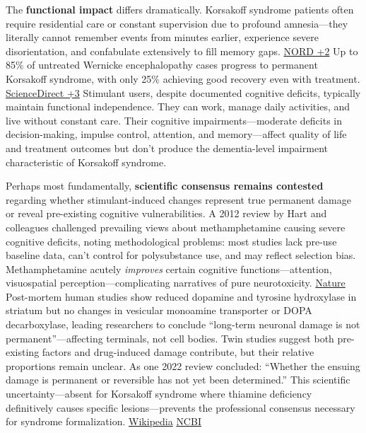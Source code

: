 The \textbf{functional impact} differs dramatically. Korsakoff syndrome patients often require residential care or constant supervision due to profound amnesia---they literally cannot remember events from minutes earlier, experience severe disorientation, and confabulate extensively to fill memory gaps. \href{https://rarediseases.org/rare-diseases/wernicke-korsakoff-syndrome/}{NORD +2} Up to 85\% of untreated Wernicke encephalopathy cases progress to permanent Korsakoff syndrome, with only 25\% achieving good recovery even with treatment. \href{https://www.sciencedirect.com/topics/biochemistry-genetics-and-molecular-biology/korsakoffs-syndrome}{ScienceDirect +3} Stimulant users, despite documented cognitive deficits, typically maintain functional independence. They can work, manage daily activities, and live without constant care. Their cognitive impairments---moderate deficits in decision-making, impulse control, attention, and memory---affect quality of life and treatment outcomes but don't produce the dementia-level impairment characteristic of Korsakoff syndrome.

Perhaps most fundamentally, \textbf{scientific consensus remains contested} regarding whether stimulant-induced changes represent true permanent damage or reveal pre-existing cognitive vulnerabilities. A 2012 review by Hart and colleagues challenged prevailing views about methamphetamine causing severe cognitive deficits, noting methodological problems: most studies lack pre-use baseline data, can't control for polysubstance use, and may reflect selection bias. Methamphetamine acutely \emph{improves} certain cognitive functions---attention, visuospatial perception---complicating narratives of pure neurotoxicity. \href{https://www.nature.com/articles/npp2011276}{Nature} Post-mortem human studies show reduced dopamine and tyrosine hydroxylase in striatum but no changes in vesicular monoamine transporter or DOPA decarboxylase, leading researchers to conclude ``long-term neuronal damage is not permanent''---affecting terminals, not cell bodies. Twin studies suggest both pre-existing factors and drug-induced damage contribute, but their relative proportions remain unclear. As one 2022 review concluded: ``Whether the ensuing damage is permanent or reversible has not yet been determined.'' This scientific uncertainty---absent for Korsakoff syndrome where thiamine deficiency definitively causes specific lesions---prevents the professional consensus necessary for syndrome formalization. \href{https://en.wikipedia.org/wiki/Wernicke–Korsakoff_syndrome}{Wikipedia} \href{https://www.ncbi.nlm.nih.gov/books/NBK537204/}{NCBI}

